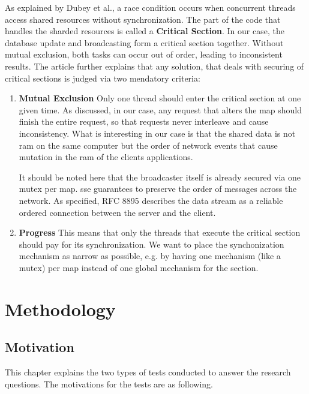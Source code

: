 \documentclass[final,oneside]{vutinfth}
\begin{document}
As explained by Dubey et al.\cite{artice_race_condition_and_dynamic_data_race_detection}, a race condition occurs when concurrent threads access shared resources without synchronization.
The part of the code that handles the sharded resources is called a \textbf{Critical Section}.
In our case, the database update and broadcasting form a critical section together.
Without mutual exclusion, both tasks can occur out of order, leading to inconsistent results.
The article \cite{artice_race_condition_and_dynamic_data_race_detection} further explains that any solution, that deals with securing of critical sections is judged via two mendatory criteria: 
\begin{enumerate}
    \item \textbf{Mutual Exclusion}
    Only one thread should enter the critical section at one given time.
    As discussed, in our case, any request that alters the map should finish the entire request, so that requests never interleave and cause inconsistency.
    What is interesting in our case is that the shared data is not ram on the same computer but the order of network events that cause mutation in the ram of the clients applications.

    It should be noted here that the broadcaster itself is already secured via one mutex per map.
    \gls{sse} guarantees to preserve the order of messages across the network.
    As specified, RFC 8895 \cite{rfc8895sse} describes the data stream as a reliable ordered connection between the server and the client.
    
    \item \textbf{Progress}
    This means that only the threads that execute the critical section should pay for its synchronization.
    We want to place the synchonization mechanism as narrow as possible, e.g. by having one mechanism (like a mutex) per map instead of one global mechanism for the section.
\end{enumerate}

\chapter{Methodology}

\section{Motivation}

This chapter explains the two types of tests conducted to answer the research questions.
The motivations for the tests are as following.
\end{document}

